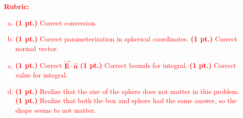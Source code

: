 \documentclass[12pt]{article} %
\newcommand{\vecfieldE}{\boldsymbol{\vec{E}}}
\newcommand{\unitvec}{\boldsymbol{\hat{n}}}
\begin{document}
\vspace*{1cm}
\textcolor{red}{
\noindent \textbf{Rubric:}
\begin{enumerate}[(a)]
    \item \textbf{(1 pt.)} Correct conversion.
\item \textbf{(1 pt.)} Correct parameterization in spherical coordinates. \textbf{(1 pt.)} Correct normal vector.
\item \textbf{(1 pt.)} Correct $\vecfieldE \cdot \unitvec$ \textbf{(1 pt.)} Correct bounds for integral. \textbf{(1 pt.)} Correct value for integral.
\item \textbf{(1 pt.)} Realize that the size of the sphere does not matter in this problem. \textbf{(1 pt.)} Realize that both the box and sphere had the same answer, so the shape seems to not matter.
\end{enumerate}
}
\end{document}
